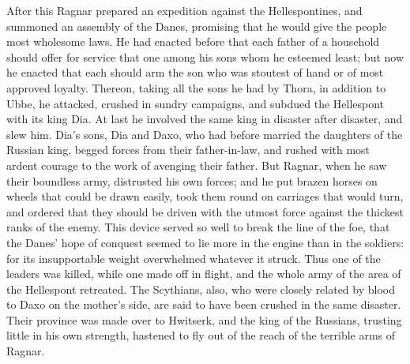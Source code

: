 \documentclass[10pt,a4paper]{report}
\begin{document}
After this Ragnar prepared an expedition against the Hellespontines, and summoned an assembly of the Danes, promising that he would give the people most wholesome laws. He had enacted before that each father of a household should offer for service that one among his sons whom he esteemed least; but now he enacted that each should arm the son who was stoutest of hand or of most approved loyalty. Thereon, taking all the sons he had by Thora, in addition to Ubbe, he attacked, crushed in sundry campaigns, and subdued the Hellespont with its king Dia. At last he involved the same king in disaster after disaster, and slew him. Dia's sons, Dia and Daxo, who had before married the daughters of the Russian king, begged forces from their father-in-law, and rushed with most ardent courage to the work of avenging their father. But Ragnar, when he saw their boundless army, distrusted his own forces; and he put brazen horses on wheels that could be drawn easily, took them round on carriages that would turn, and ordered that they should be driven with the utmost force against the thickest ranks of the enemy. This device served so well to break the line of the foe, that the Danes' hope of conquest seemed to lie more in the engine than in the soldiers: for its insupportable weight overwhelmed whatever it struck. Thus one of the leaders was killed, while one made off in flight, and the whole army of the area of the Hellespont retreated. The Scythians, also, who were closely related by blood to Daxo on the mother's side, are said to have been crushed in the same disaster. Their province was made over to Hwitserk, and the king of the Russians, trusting little in his own strength, hastened to fly out of the reach of the terrible arms of Ragnar.\\
\end{document}
